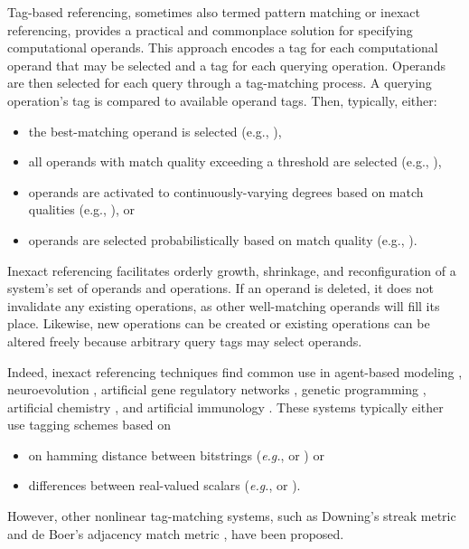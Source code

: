 Tag-based referencing, sometimes also termed pattern matching or inexact referencing, provides a practical and commonplace solution for specifying computational operands.
This approach encodes a tag for each computational operand that may be selected and a tag for each querying operation.
Operands are then selected for each query through a tag-matching process.
A querying operation's tag is compared to available operand tags.
Then, typically, either:
\begin{itemize}
  \item the best-matching operand is selected (e.g., \citep{spector2012tag}),
  \item all operands with match quality exceeding a threshold are selected (e.g., \citep{riolo2001evolution}),
  \item operands are activated to continuously-varying degrees based on match qualities (e.g., \citep{banzhaf2003artificial}), or
  \item operands are selected probabilistically based on match quality (e.g., \citep{seiden1992simulation}).
\end{itemize}

Inexact referencing facilitates orderly growth, shrinkage, and reconfiguration of a system's set of operands and operations.
If an operand is deleted, it does not invalidate any existing operations, as other well-matching operands will fill its place.
Likewise, new operations can be created or existing operations can be altered freely because arbitrary query tags may select operands.

Indeed, inexact referencing techniques find common use in agent-based modeling \citep{riolo2001evolution}, neuroevolution \citep{reisinger2007acquiring}, artificial gene regulatory networks \citep{banzhaf2003artificial}, genetic programming \citep{spector2011tag, lalejini2018evolving}, artificial chemistry \citep{dittrich2001artificial}, and artificial immunology \citep{timmis2008theoretical}.
These systems typically either use tagging schemes based on
\begin{itemize}
    \item on hamming distance between bitstrings (\textit{e.g.}, \cite{lalejini2018evolving} or \cite{banzhaf2003artificial}) or
    \item differences between real-valued scalars (\textit{e.g.}, \cite{riolo2001evolution} or \cite{spector2011tag}).
\end{itemize}
However, other nonlinear tag-matching systems, such as Downing's streak metric \citep{downing2015intelligence} and de Boer's adjacency match metric \citep{DEBOER1991381}, have been proposed.

